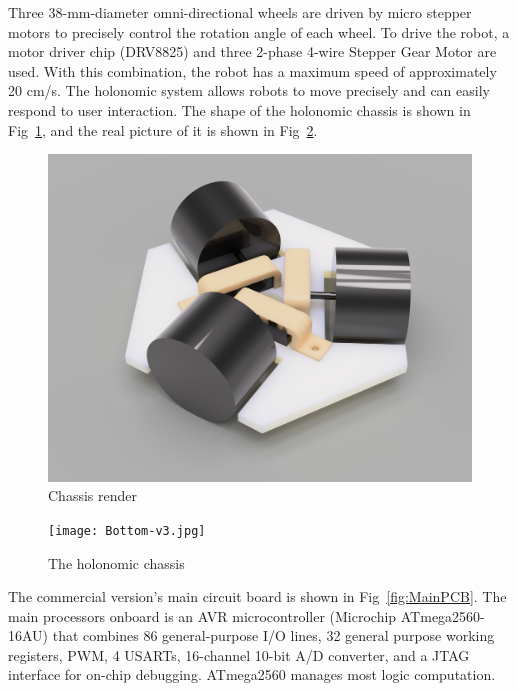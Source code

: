 \documentclass[sigconf]{acmart}
\begin{document}
Three 38-mm-diameter omni-directional wheels are driven by micro stepper motors to precisely control the rotation angle of each wheel. To drive the robot, a motor driver chip (DRV8825) and three 2-phase 4-wire Stepper Gear Motor are used. With this combination, the robot has a maximum speed of approximately 20 cm/s. The holonomic system allows robots to move precisely and can easily respond to user interaction. The shape of the holonomic chassis is shown in Fig~\ref{fig:ChassisRender}, and the real picture of it is shown in Fig~\ref{fig:chassis}.

\begin{figure}[h]
  \centering
  \includegraphics[width=\linewidth]{Assembled.png}
  \caption{Chassis render}
  \label{fig:ChassisRender}
\end{figure}

\begin{figure}[h]
  \centering
  \texttt{[image: Bottom-v3.jpg]}
  \caption{The holonomic chassis}
  \label{fig:chassis}
\end{figure}

The commercial version's main circuit board is shown in Fig~\ref{fig:MainPCB}. The main processors onboard is an AVR microcontroller (Microchip ATmega2560-16AU) that combines 86 general-purpose I/O lines, 32 general purpose working registers, PWM, 4 USARTs, 16-channel 10-bit A/D converter, and a JTAG interface for on-chip debugging. ATmega2560 manages most logic computation.
\end{document}
